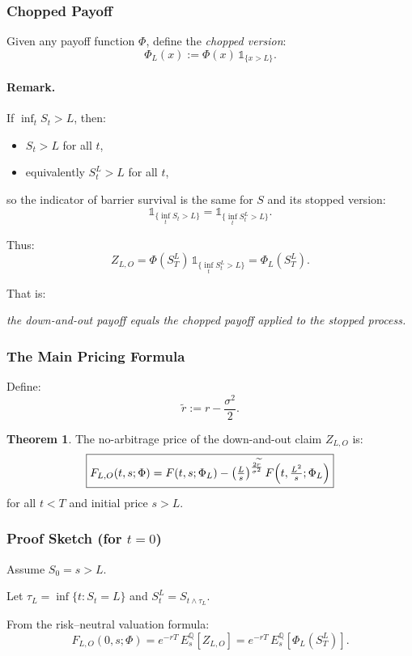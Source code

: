 \documentclass[12pt,a4paper]{article}
\theoremstyle{definition}
\newtheorem{theorem}{Theorem}[section]
\begin{document}
\subsubsection{Chopped Payoff}

Given any payoff function $\Phi$, define the \emph{chopped version}:
\[
\Phi_L(x) := \Phi(x)\, \mathds{1}_{\{x > L\}}.
\]

\paragraph{Remark.}

If $\inf_t S_t > L$, then:
\begin{itemize}
\item $S_t > L$ for all $t$,
\item equivalently $S_t^L > L$ for all $t$,
\end{itemize}
so the indicator of barrier survival is the same for $S$ and its stopped version:
\[
\mathds{1}_{\{\inf_t S_t > L\}} = \mathds{1}_{\{\inf_t S_t^L > L\}}.
\]

Thus:
\[
Z_{L,O} = \Phi(S_T^L)\, \mathds{1}_{\{\inf_t S_t^L > L\}} = \Phi_L(S_T^L).
\]

That is:

\emph{the down-and-out payoff equals the chopped payoff applied to the stopped process.}

\subsubsection{The Main Pricing Formula}

Define:
\[
\widetilde{r} := r - \frac{\sigma^2}{2}.
\]

\begin{theorem}
The no-arbitrage price of the down-and-out claim $Z_{L,O}$ is:
\[
\fbox{$F_{L,O}(t, s; \Phi) = F(t, s; \Phi_L) - \left(\frac{L}{s}\right)^{\frac{2\widetilde{r}}{\sigma^2}} F\!\left(t, \frac{L^2}{s}; \Phi_L\right)$}
\]
for all $t < T$ and initial price $s > L$.
\end{theorem}

\subsubsection{Proof Sketch (for $t = 0$)}

Assume $S_0 = s > L$.

Let $\tau_L = \inf\{t : S_t = L\}$ and $S_t^L = S_{t \wedge \tau_L}$.

From the risk--neutral valuation formula:
\[
F_{L,O}(0, s; \Phi) = e^{-rT}\, E_s^\mathbb{Q}[Z_{L,O}] = e^{-rT}\, E_s^\mathbb{Q}[\Phi_L(S_T^L)].
\]
\end{document}
